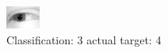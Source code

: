 \begin{figure}[h!]
\begin{center}
\includegraphics[width=0.60\columnwidth]{figures/ID2409_class_3_target_4.png}
\end{center}
\caption{ Classification: 3 actual target: 4}
\label{fig:ID2409_class_3_target_4}
\end{figure}
